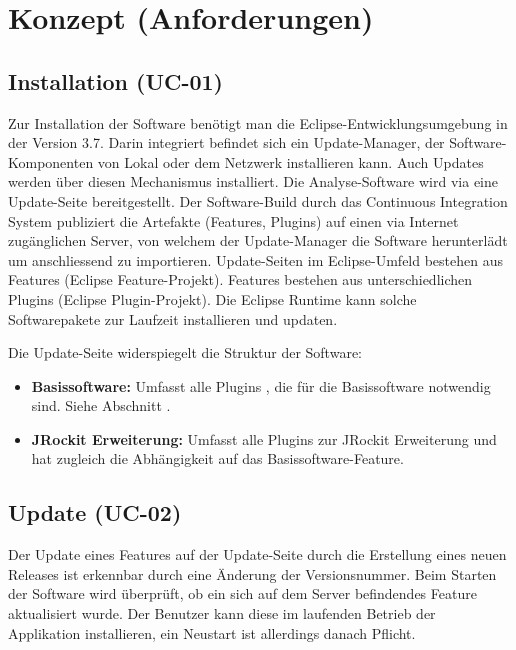 \chapter{Konzept (Anforderungen)}\label{konzept_2}
\section{Installation (UC-01)}\label{installation}
Zur Installation der Software benötigt man die Eclipse-Entwicklungsumgebung in der Version 3.7. Darin integriert befindet sich ein Update-Manager, der Software-Komponenten von Lokal oder dem Netzwerk installieren kann. Auch Updates werden über diesen Mechanismus installiert. Die Analyse-Software wird via eine Update-Seite bereitgestellt. Der Software-Build durch das Continuous Integration System publiziert die Artefakte (Features, Plugins) auf einen via Internet zugänglichen Server, von welchem der Update-Manager die Software herunterlädt um anschliessend zu importieren. Update-Seiten im Eclipse-Umfeld bestehen aus Features (Eclipse Feature-Projekt). Features bestehen aus unterschiedlichen Plugins (Eclipse Plugin-Projekt). Die Eclipse Runtime kann solche Softwarepakete zur Laufzeit installieren und updaten.

Die Update-Seite widerspiegelt die Struktur der Software:
\begin{itemize}
\item \textbf{Basissoftware:} Umfasst alle Plugins , die für die Basissoftware notwendig sind. Siehe Abschnitt .
\item \textbf{JRockit Erweiterung: }Umfasst alle Plugins zur JRockit Erweiterung und hat zugleich die Abhängigkeit auf das Basissoftware-Feature.
\end{itemize}

\section{Update (UC-02)}
Der Update eines Features auf der Update-Seite durch die Erstellung eines neuen Releases ist erkennbar durch eine Änderung der Versionsnummer. Beim Starten der Software wird überprüft, ob ein sich auf dem Server befindendes Feature aktualisiert wurde. Der Benutzer kann diese im laufenden Betrieb der Applikation installieren, ein Neustart ist allerdings danach Pflicht.

